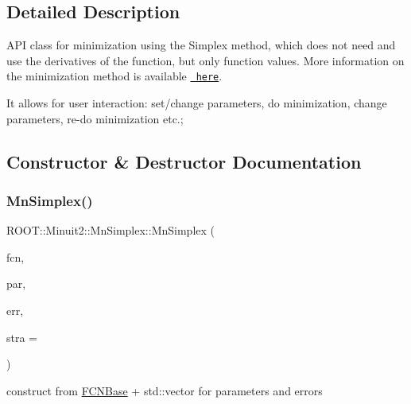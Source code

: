 \subsection{Detailed Description}
A\+PI class for minimization using the Simplex method, which does not need and use the derivatives of the function, but only function values. More information on the minimization method is available \href{http://seal.web.cern.ch/mathlibs/documents/minuit/mntutorial.pdf}{\texttt{ here}}.

It allows for user interaction\+: set/change parameters, do minimization, change parameters, re-\/do minimization etc.; 

\subsection{Constructor \& Destructor Documentation}
\mbox{\label{classROOT_1_1Minuit2_1_1MnSimplex_abc4ddf29140ab0ada1e90afbc33359cf}} 
\subsubsection{\texorpdfstring{MnSimplex()}{MnSimplex()}\hspace{0.1cm}{\footnotesize\ttfamily [1/14]}}
{\footnotesize\ttfamily R\+O\+O\+T\+::\+Minuit2\+::\+Mn\+Simplex\+::\+Mn\+Simplex (\begin{DoxyParamCaption}\item[{const \mbox{\hyperlink{classROOT_1_1Minuit2_1_1FCNBase}{F\+C\+N\+Base}} \&}]{fcn,  }\item[{const std\+::vector$<$ double $>$ \&}]{par,  }\item[{const std\+::vector$<$ double $>$ \&}]{err,  }\item[{unsigned int}]{stra = {} }\end{DoxyParamCaption})\hspace{0.3cm}{\ttfamily [inline]}}



construct from \mbox{\hyperlink{classROOT_1_1Minuit2_1_1FCNBase}{F\+C\+N\+Base}} + std\+::vector for parameters and errors 

\mbox{\label{classROOT_1_1Minuit2_1_1MnSimplex_a7c7c4c6af82a37f75f574e80db9b4d08}} 
